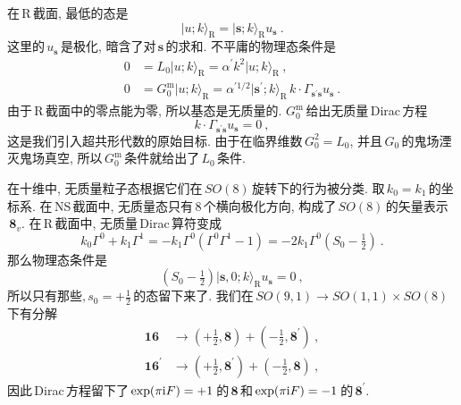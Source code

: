 在\,R\,截面, 最低的态是
\begin{equation}
    \lvert u;k\rangle_{\text{R}} = \lvert\mathbf{s};k\rangle_{\text{R}} u_{\mathbf{s}} \:. \label{10.5.12}
\end{equation}
这里的$\,u_{\mathbf{s}}\,$是极化, 暗含了对$\,\mathbf{s}\,$的求和. 不平庸的物理态条件是
\begin{subequations}
    \begin{align}
        0 &= L_{0}\lvert u;k\rangle_{\text{R}} = \alpha^{\prime}k^{2}\lvert u;k\rangle_{\text{R}} \:, \label{10.5.13a}\\
        0 &= G_{0}^{\text{m}}\lvert u;k\rangle_{\text{R}}
        =\alpha^{\prime 1/2} \lvert \mathbf{s}^{\prime};k\rangle_{\text{R}}\, k\cdot \Gamma_{\mathbf{s}^{\prime}\mathbf{s}} u_{\mathbf{s}} \:. \label{10.5.13b}
    \end{align} \label{10.5.13}
\end{subequations}
由于\,R\,截面中的零点能为零, 所以基态是无质量的. $G_{0}^{\text{m}}\,$给出无质量\,Dirac\,方程
\begin{equation}
    k\cdot \Gamma_{\mathbf{s}^{\prime}\mathbf{s}} u_{\mathbf{s}} =0\:, \label{10.5.14}
\end{equation}
这是我们引入超共形代数的原始目标. 由于在临界维数$\,G_{0}^{2} = L_{0}$, 并且$\,G_{0}\,$的鬼场湮灭鬼场真空, 所以$\,G_{0}^{\text{m}}\,$条件就给出了\,$L_{0}\,$条件. 

在十维中, 无质量粒子态根据它们在$\,SO(8)\,$旋转下的行为被分类. 取$\,k_{0}=k_{1}\,$的坐标系. 在\,NS\,截面中, 无质量态只有\,8\,个横向极化方向, 构成了$\,SO(8)\,$的矢量表示$\,\mathbf{8}_{v}$. 在\,R\,截面中, 无质量\,Dirac\,算符变成
\begin{equation}
    k_{0}\Gamma^{0}+k_{1}\Gamma^{1} = -k_{1}\Gamma^{0}(\Gamma^{0}\Gamma^{1}-1)=-2k_{1}\Gamma^{0}(S_{0}-\tfrac{1}{2})\:.\label{10.5.15}
\end{equation}
那么物理态条件是
\begin{equation}
    (S_{0}-\tfrac{1}{2})\lvert\mathbf{s},0;k\rangle_{\text{R}} u_{\mathbf{s}} =0 \:,\label{10.5.16}
\end{equation}
所以只有那些$,s_{0}=+\frac{1}{2}\,$的态留下来了. 我们在$\,SO(9,1)\to SO(1,1)\times SO(8)\,$下有分解
\begin{subequations}
    \begin{align}
        \mathbf{16} &\to (+\tfrac{1}{2},\mathbf{8}) + (-\tfrac{1}{2},\mathbf{8}^{\prime}) \:, \label{10.5.17a} \\
        \mathbf{16}^{\prime} &\to (+\tfrac{1}{2},\mathbf{8}^{\prime}) + (-\tfrac{1}{2},\mathbf{8})\:, \label{10.5.17b}
    \end{align}  \label{10.5.17}
\end{subequations}
因此\,Dirac\,方程留下了$\,\exp(\pi\mathrm{i} F)=+1\,$的$\,\mathbf{8}\,$和$\,\exp(\pi\mathrm{i} F)=-1\,$的$\,\mathbf{8}^{\prime}$.

